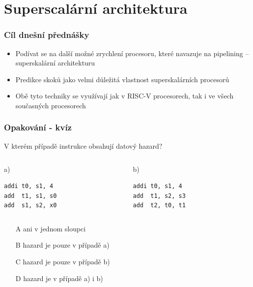 \documentclass{beamer}
\subtitle{Lekce 05. Superskalární architektura\\a\\prediktory skoků}
\author{Pavel Píša \phantom{xxxxxxxxx} Petr Štěpán \\ \small\texttt{pisa@fel.cvut.cz}\phantom{xxxx}\small\texttt{stepan@fel.cvut.cz}}
\begin{document}
\maketitle

\section{Superscalární architektura}

\begin{frame}
\frametitle{Cíl dnešní přednášky}

\begin{itemize}
 \item Podívat se na další možné zrychlení procesoru, které navazuje na pipelining -- superskalární architekturu
 \item Predikce skoků jako velmi důležitá vlastnost superskalárních procesorů
 \item Obě tyto techniky se využívají jak v RISC-V procesorech, tak i ve všech současných procesorech
\end{itemize}

\end{frame}

\begin{frame}[fragile]
\frametitle{Opakování - kvíz}

V kterém případě instrukce obsahují datový hazard?

\begin{columns}[T]
\begin{column}{0.40\textwidth}
\phantom{xxxxx}a)

\begin{verbatim}
addi t0, s1, 4
add  t1, s1, s0
add  s1, s2, x0
\end{verbatim}
\end{column}
\begin{column}{0.40\textwidth}
\phantom{xxxxx}b)

\begin{verbatim}
addi t0, s1, 4
add  t1, s2, s3
add  t2, t0, t1
\end{verbatim}
\end{column}
\end{columns}
\bigskip
\begin{itemize}
 \item[A] ani v jednom sloupci
 \item[B] hazard je pouze v případě a)
 \item[C] hazard je pouze v případě b)
 \item[D] hazard je v případě a) i b)
\end{itemize}

\end{frame}
\end{document}
